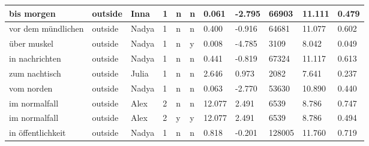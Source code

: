 \begin{longtable}{|p{4cm}|p{1cm}|p{1.2cm}|p{0.5cm}|p{0.5cm}|p{0.5cm}|R{1cm}|R{1cm}|R{1cm}|R{1cm}|R{1cm}|}
bis morgen                 & outside           & Inna          & 1                                   & n                          & n                          & 0.061      & -2.795        & 66903                   & 11.111                        & 0.479                   \\ \hline
vor dem m\"{u}ndlichen     & outside           & Nadya         & 1                                   & n                          & n                          & 0.400      & -0.916        & 64681                   & 11.077                        & 0.602                   \\ \hline
\"{u}ber muskel            & outside           & Nadya         & 1                                   & n                          & y                          & 0.008      & -4.785        & 3109                    & 8.042                         & 0.049                   \\ \hline
in nachrichten             & outside           & Nadya         & 1                                   & n                          & n                          & 0.441      & -0.819        & 67324                   & 11.117                        & 0.613                   \\ \hline
zum nachtisch              & outside           & Julia         & 1                                   & n                          & n                          & 2.646      & 0.973         & 2082                    & 7.641                         & 0.237                   \\ \hline
vom norden                 & outside           & Nadya         & 1                                   & n                          & n                          & 0.063      & -2.770        & 53630                   & 10.890                        & 0.440                   \\ \hline
im normalfall              & outside           & Alex          & 2                                   & n                          & n                          & 12.077     & 2.491         & 6539                    & 8.786                         & 0.747                   \\ \hline
im normalfall              & outside           & Alex          & 2                                   & y                          & y                          & 12.077     & 2.491         & 6539                    & 8.786                         & 0.494                   \\ \hline
in \"{o}ffentlichkeit      & outside           & Nadya         & 1                                   & n                          & n                          & 0.818      & -0.201        & 128005                  & 11.760                        & 0.719                   \\ \hline

\end{longtable}
